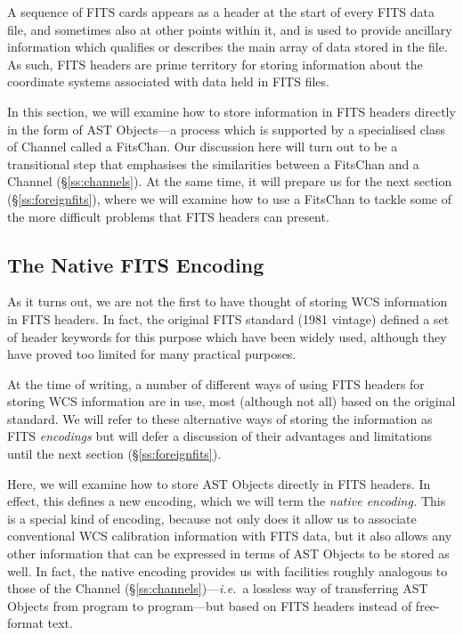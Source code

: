 \documentclass[twoside,11pt]{article}
\newcommand{\secref}[1]{\S\ref{#1}}
\newcommand{\secref}[1]{\ref{#1}}
\begin{document}
A sequence of FITS cards appears as a header at the start of every
FITS data file, and sometimes also at other points within it, and is
used to provide ancillary information which qualifies or describes the
main array of data stored in the file. As such, FITS headers are prime
territory for storing information about the coordinate systems
associated with data held in FITS files.

In this section, we will examine how to store information in FITS
headers directly in the form of AST Objects---a process which is
supported by a specialised class of Channel called a FitsChan. Our
discussion here will turn out to be a transitional step that
emphasises the similarities between a FitsChan and a Channel
(\secref{ss:channels}). At the same time, it will prepare us for the
next section (\secref{ss:foreignfits}), where we will examine how to
use a FitsChan to tackle some of the more difficult problems that FITS
headers can present.

\subsection{\label{ss:nativeencoding}The Native FITS Encoding}

As it turns out, we are not the first to have thought of storing WCS
information in FITS headers. In fact, the original FITS standard (1981
vintage) defined a set of header keywords for this purpose which have
been widely used, although they have proved too limited for many
practical purposes.

At the time of writing, a number of different ways of using FITS
headers for storing WCS information are in use, most (although not
all) based on the original standard. We will refer to these
alternative ways of storing the information as FITS {\em{encodings}}
but will defer a discussion of their advantages and limitations until
the next section (\secref{ss:foreignfits}).

Here, we will examine how to store AST Objects directly in FITS
headers. In effect, this defines a new encoding, which we will term
the {\em{native encoding.}} This is a special kind of encoding,
because not only does it allow us to associate conventional
WCS calibration information with FITS data, but it also allows any other
information that can be expressed in terms of AST Objects to be stored
as well.  In fact, the native encoding provides us with facilities
roughly analogous to those of the Channel
(\secref{ss:channels})---{\em{i.e.}}\ a lossless way of
transferring AST Objects from program to program---but based on FITS
headers instead of free-format text.
\end{document}
